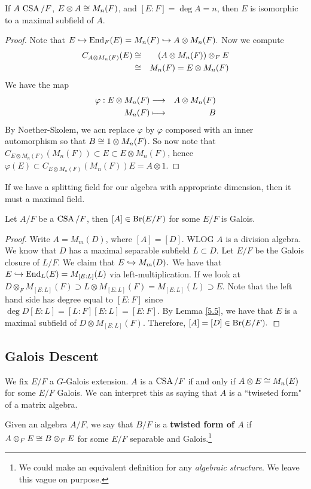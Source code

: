 \begin{prop}\label{5.5}
If $A \, \operatorname{CSA}/F$, $E \otimes A \cong M_n(F)$, and $[E:F] = \deg A = n$, then $E$ is isomorphic to a maximal subfield of $A$.
\end{prop}


\begin{proof}
Note that $E \hookrightarrow \operatorname{End}_F(E) = M_n(F) \hookrightarrow A \otimes M_n(F).$ Now we compute
\begin{eqnarray*}
C_{A\otimes M_n(F)}(E) & \cong & (A\otimes M_n(F)) \otimes_F E \\
& \cong & M_n(F)  = E \otimes M_n(F)
\end{eqnarray*}
We have the map
\begin{eqnarray*}
\varphi :  E \otimes M_n(F) & \longrightarrow & A \otimes M_n(F) \\
M_n(F) & \longmapsto & B
\end{eqnarray*}
By Noether-Skolem, we acn replace $\varphi$ by $\varphi$ composed with an inner automorphism so that $B \cong 1 \otimes M_n(F)$. So now note that $C_{E \otimes M_n(F)}(M_n(F)) \subset E \subset E \otimes M_n(F)$, hence $\varphi (E) \subset C_{E \otimes M_n(F)}(M_n(F))E =A \otimes 1.$
\end{proof}
If we have a splitting field for our algebra with appropriate dimension, then it must a maximal field.
\begin{coro}\label{5.6}
Let $A /F$ be a $\operatorname{CSA}/F$, then $[A] \in \operatorname{Br} (E/F)$ for some $E/F$ is Galois.
\end{coro}

\begin{proof}
Write $A = M_m(D)$, where $[A] = [D]$. WLOG $A$ is a division algebra. We know that $D$ has a maximal separable subfield $L \subset D$. Let $E/F$ be the Galois closure of $L/F$. We claim that $E \hookrightarrow M_m(D).$  We have that $E \hookrightarrow \operatorname{End}_L(E) = M_{[E:L]}(L)$ via left-multiplication. If we look at $D \otimes_F M_{[E:L]}(F)\supset L \otimes M_{[E:L]}(F) = M_{[E:L]}(L) \supset E$. Note that the left hand side has degree equal to $[E:F]$ since $\deg D [E:L] = [L:F][E:L] = [E:F].$ By Lemma \ref{5.5}, we have that $E$ is a maximal subfield of $D \otimes M_{[E:L]}(F)$. Therefore, $[A] = [D] \in \operatorname{Br}(E/F).$
\end{proof}

\subsection{Galois Descent}We fix $E/F$ a $G$-Galois extension.
$A$ is a $\operatorname{CSA}/F$ if and only if $A\otimes E \cong M_n(E)$ for some $E/F$ Galois. We can interpret this as saying that $A$ is a ``twiseted form" of a matrix algebra.
\begin{defn}\label{5.8}
Given an algebra $A/F$, we say that $B/F$ is a \textbf{twisted form of $A$} if $A \otimes_F E \cong B \otimes_F E$ for some $E/F$ separable and Galois.\footnote{We could make an equivalent definition for any \textit{algebraic structure}. We leave this vague on purpose.}
\end{defn}

